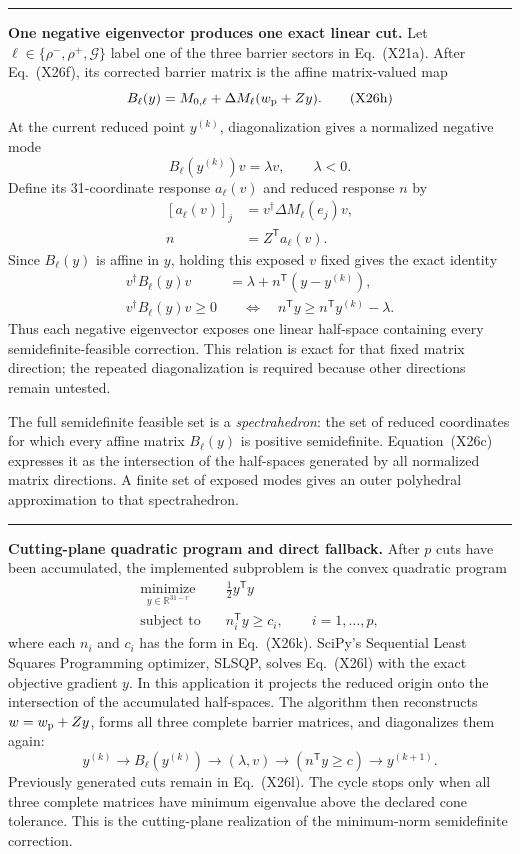 \documentclass[10pt,letterpaper,twocolumn]{article}
\newcommand{\R}{\mathbb R}
\newcommand{\conceptbreak}{%
  \par\medskip\noindent
  {\color{black!30}\rule{\columnwidth}{0.35pt}}%
  \par\medskip
}
\begin{document}
\conceptbreak
\textbf{One negative eigenvector produces one exact linear cut.}
Let \(\ell\in\{\rho^-,\rho^+,\mathcal G\}\) label one of the three barrier
sectors in Eq.~(X21a).  After Eq.~(X26f), its corrected barrier matrix is the
affine matrix-valued map
\[
B_\ell(y)
=M_{0,\ell}+\Delta M_\ell(w_{\rm p}+Zy).
\tag{X26h}
\]
At the current reduced point \(y^{(k)}\), diagonalization gives a normalized
negative mode
\[
B_\ell(y^{(k)})v=\lambda v,
\qquad \lambda<0.
\tag{X26i}
\]
Define its 31-coordinate response \(a_\ell(v)\) and reduced response \(n\) by
\[
\begin{aligned}
[a_\ell(v)]_j
&=v^\dagger\Delta M_\ell(e_j)v,\\
n&=Z^{\mathsf T}a_\ell(v).
\end{aligned}
\tag{X26j}
\]
Since \(B_\ell(y)\) is affine in \(y\), holding this exposed \(v\) fixed gives
the exact identity
\[
\begin{aligned}
v^\dagger B_\ell(y)v
&=\lambda+n^{\mathsf T}(y-y^{(k)}),\\
v^\dagger B_\ell(y)v\geq0
&\quad\Longleftrightarrow\quad
n^{\mathsf T}y\geq
n^{\mathsf T}y^{(k)}-\lambda.
\end{aligned}
\tag{X26k}
\]
Thus each negative eigenvector exposes one linear half-space containing every
semidefinite-feasible correction.  This relation is exact for that fixed
matrix direction; the repeated diagonalization is required because other
directions remain untested.

The full semidefinite feasible set is a \emph{spectrahedron}: the set of
reduced coordinates for which every affine matrix \(B_\ell(y)\) is positive
semidefinite.  Equation~(X26c) expresses it as the intersection of the
half-spaces generated by all normalized matrix directions.  A finite set of
exposed modes gives an outer polyhedral approximation to that spectrahedron.

\conceptbreak
\textbf{Cutting-plane quadratic program and direct fallback.}
After \(p\) cuts have been accumulated, the implemented subproblem is the
convex quadratic program
\[
\boxed{
\begin{aligned}
\underset{y\in\R^{31-r}}{\operatorname{minimize}}\quad
&\frac12y^{\mathsf T}y\\
\text{subject to}\quad
&n_i^{\mathsf T}y\geq c_i,
\qquad i=1,\ldots,p,
\end{aligned}}
\tag{X26l}
\]
where each \(n_i\) and \(c_i\) has the form in Eq.~(X26k).  SciPy's
Sequential Least Squares Programming optimizer, SLSQP, solves Eq.~(X26l) with
the exact objective gradient \(y\).  In this application it projects the
reduced origin onto the intersection of the accumulated half-spaces.  The
algorithm then reconstructs \(w=w_{\rm p}+Zy\), forms all three complete
barrier matrices, and diagonalizes them again:
\[
y^{(k)}
\longrightarrow B_\ell(y^{(k)})
\longrightarrow(\lambda,v)
\longrightarrow(n^{\mathsf T}y\geq c)
\longrightarrow y^{(k+1)}.
\tag{X26m}
\]
Previously generated cuts remain in Eq.~(X26l).  The cycle stops only when all
three complete matrices have minimum eigenvalue above the declared cone
tolerance.  This is the cutting-plane realization of the minimum-norm
semidefinite correction.
\end{document}
